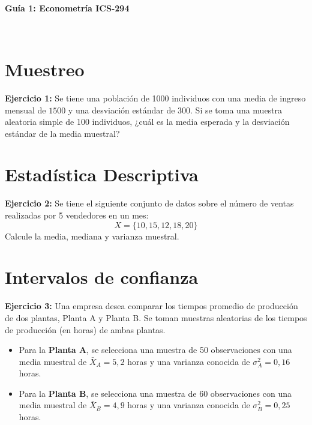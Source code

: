 \documentclass[10pt,a4paper]{article}
\begin{document}
\vspace{5cm}

\begin{center}
\begin{Large}
\textbf{\\Guía 1: Econometría ICS-294}
\end{Large}\\
\end{center}

\section{Muestreo}

\textbf{Ejercicio 1:} Se tiene una población de 1000 individuos con una media de ingreso mensual de $1500$ y una desviación estándar de $300$. Si se toma una muestra aleatoria simple de 100 individuos, ¿cuál es la media esperada y la desviación estándar de la media muestral?



\section{Estadística Descriptiva}

\textbf{Ejercicio 2:} Se tiene el siguiente conjunto de datos sobre el número de ventas realizadas por 5 vendedores en un mes:
$$X = \{10,15,12,18,20\}$$
Calcule la media, mediana y varianza muestral.


\section{Intervalos de confianza}

\textbf{Ejercicio 3:} Una empresa desea comparar los tiempos promedio de producción de dos plantas, Planta A y Planta B. Se toman muestras aleatorias de los tiempos de producción (en horas) de ambas plantas.

\begin{itemize}
    \item Para la \textbf{Planta A}, se selecciona una muestra de 50 observaciones con una media muestral de \( \bar{X}_A = 5,2 \) horas y una varianza conocida de \( \sigma_A^2 = 0,16 \) horas.
    \item Para la \textbf{Planta B}, se selecciona una muestra de 60 observaciones con una media muestral de \( \bar{X}_B = 4,9 \) horas y una varianza conocida de \( \sigma_B^2 = 0,25 \) horas.
\end{itemize}
\end{document}
